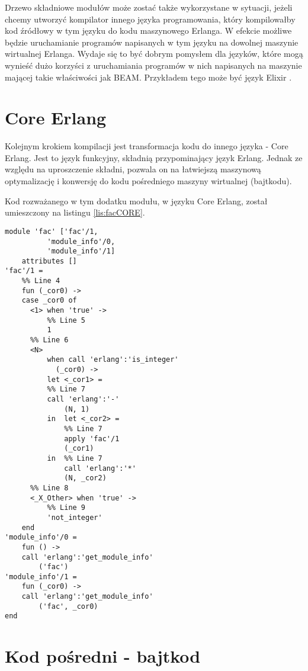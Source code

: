 Drzewo składniowe modułów może zostać także wykorzystane w sytuacji, jeżeli chcemy utworzyć kompilator innego języka programowania, który kompilowałby kod źródłowy w tym języku do kodu maszynowego Erlanga. W efekcie możliwe będzie uruchamianie programów napisanych w tym języku na dowolnej maszynie wirtualnej Erlanga. Wydaje się to być dobrym pomysłem dla języków, które mogą wynieść dużo korzyści z uruchamiania programów w nich napisanych na maszynie mającej takie właściwości jak BEAM. Przykładem tego może być język Elixir \cite{elixir}.
\section{Core Erlang}
\label{sec:compilationCore}

Kolejnym krokiem kompilacji jest transformacja kodu do innego języka - Core Erlang. Jest to język funkcyjny, składnią przypominający język Erlang. Jednak ze względu na uproszczenie składni, pozwala on na łatwiejszą maszynową optymalizację i konwersję do kodu pośredniego maszyny wirtualnej (bajtkodu).

Kod rozważanego w tym dodatku modułu, w języku Core Erlang, został umieszczony na listingu \ref{lis:facCORE}.

\begin{lstlisting}[style=erlang, caption=Moduł \texttt{fac} w Core Erlang, label=lis:facCORE]
module 'fac' ['fac'/1,
	      'module_info'/0,
	      'module_info'/1]
    attributes []
'fac'/1 =
    %% Line 4
    fun (_cor0) ->
	case _cor0 of
	  <1> when 'true' ->
	      %% Line 5
	      1
	  %% Line 6
	  <N>
	      when call 'erlang':'is_integer'
		    (_cor0) ->
	      let <_cor1> =
		  %% Line 7
		  call 'erlang':'-'
		      (N, 1)
	      in  let <_cor2> =
		      %% Line 7
		      apply 'fac'/1
			  (_cor1)
		  in  %% Line 7
		      call 'erlang':'*'
			  (N, _cor2)
	  %% Line 8
	  <_X_Other> when 'true' ->
	      %% Line 9
	      'not_integer'
	end
'module_info'/0 =
    fun () ->
	call 'erlang':'get_module_info'
	    ('fac')
'module_info'/1 =
    fun (_cor0) ->
	call 'erlang':'get_module_info'
	    ('fac', _cor0)
end
\end{lstlisting}

\section{Kod pośredni -  bajtkod}

